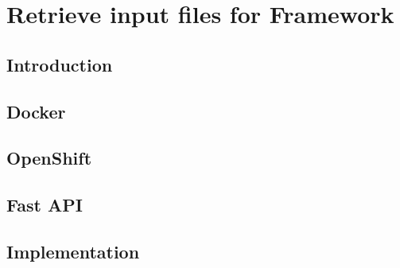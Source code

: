 \section{Retrieve input files for Framework}
\subsection{Introduction}
\subsection{Docker}
\subsection{OpenShift}
\subsection{Fast API}

\subsection{Implementation}
